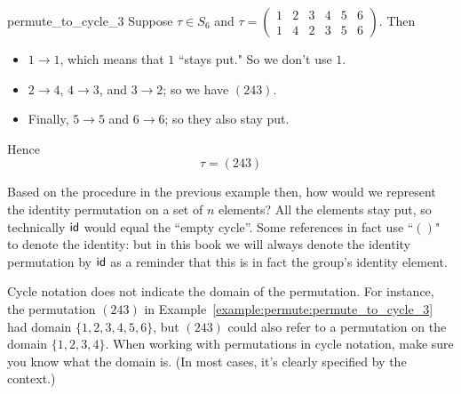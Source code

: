 \begin{example}{permute_to_cycle_3}
Suppose $\tau \in S_6$ and $\tau  = \begin{pmatrix} 1 & 2 & 3 & 4 & 5 & 6 \\ 1 & 4 & 2 & 3 & 5 & 6 \end{pmatrix}$.  Then
\begin{itemize}
\item
$1 \to 1$, which means that $1$ ``stays put."  So we don't use $1$.
\item
$2 \to 4$, $4 \to 3$, and $3 \to 2$; so we have $(243)$.
\item
Finally, $5 \to 5$ and $6 \to 6$; so they also stay put.
\end{itemize}
Hence 
\[
\tau = (243) \]
\end{example}

Based on the procedure in the previous example then, how would we represent the identity permutation on a set of $n$ elements?  All the elements stay put, so technically ${\sf{i}d}$ would equal the ``empty cycle''.  Some references in fact use  ``$()$" to denote the identity: but in this book we will always denote
the identity permutation  by ${\sf{i}d}$ as a reminder that this is in fact the group's identity element.

\begin{warn}
Cycle notation does not indicate the domain of the permutation. For instance, the permutation $(243)$ in Example~\ref{example:permute:permute_to_cycle_3} had domain $\{1,2,3,4,5,6\}$, but  $(243)$ could also refer to a permutation on the domain $\{1,2,3,4\}$. When working with permutations in cycle notation, make sure you know what the domain is. (In most cases, it's clearly specified by the context.)
\end{warn}

